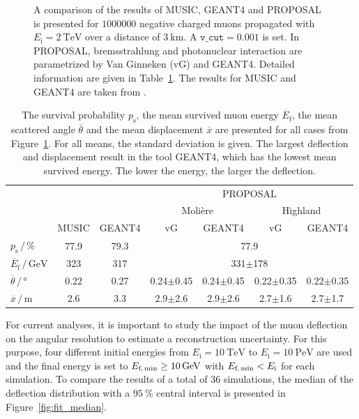 \begin{figure}
    \caption{A comparison of the results of MUSIC, GEANT4 and PROPOSAL is presented for $\num{1000000}$ negative charged muons propagated with 
    $E_{\text{i}} = \SI{2}{\tera\electronvolt}$ over a distance of 
    $\SI{3}{\kilo\meter}$. A $\texttt{v\_cut} = 0.001$ is set. In PROPOSAL, 
    bremsstrahlung and photonuclear interaction are parametrized by 
    Van Ginneken (vG) and GEANT4. Detailed information are given in 
    Table~\ref{tab:compare_MUSIC}. The results for MUSIC and GEANT4 are taken from 
    \cite{comparison_MUSIC_GEANT4_2009}.}
    \label{fig:compare_MUSIC}
\end{figure}



\begin{table}
    \small
    \centering
    \caption{The survival probability $p_{\text{s}}$, the mean survived muon 
    energy $\overline{E}_{\text{f}}$, the mean scattered angle $\overline{\theta}$ 
    and the mean displacement $\overline{x}$ are presented for all cases from 
    Figure~\ref{fig:compare_MUSIC}. For all means, the standard deviation is given.
    The largest deflection and displacement result in the tool GEANT4, which has the lowest mean survived energy. The lower the energy, the larger the deflection.}
    \begin{tabular}{l|cc|cccc}
        \toprule
        & & & \multicolumn{4}{c}{PROPOSAL} \\
        &  & & \multicolumn{2}{c}{Molière} & \multicolumn{2}{c}{Highland} \\
        & MUSIC & GEANT4 & vG & GEANT4 & vG & GEANT4 \\
        \midrule
        $p_{\text{s}}\,/\,\si{\percent}$ & 77.9 & 79.3 &  \multicolumn{4}{c}{77.9}\\
        $\overline{E}_{\text{f}}\,/\,\si{\giga\electronvolt}$ & 323 & 317 & \multicolumn{4}{c}{331$\pm$178} \\
        $\overline{\theta}\,/\,\si{\degree}$ & 0.22 & 0.27 & 0.24$\pm$0.45 & 0.24$\pm$0.45 & 0.22$\pm$0.35 & 0.22$\pm$0.35   \\
        $\overline{x}\,/\,\si{\meter}$ & 2.6 & 3.3 & 2.9$\pm$2.6 & 2.9$\pm$2.6 & 2.7$\pm$1.6 & 2.7$\pm$1.7  \\
     \bottomrule
    \end{tabular}
    \label{tab:compare_MUSIC}
\end{table}




For current analyses, it is important to study the impact of the muon 
deflection on the angular resolution to estimate a reconstruction uncertainty.
For this purpose, four different initial energies 
from $E_{\text{i}} = \SI{10}{\tera\electronvolt}$ to 
$E_{\text{i}} = \SI{10}{\peta\electronvolt}$ are used and the final 
energy is set to $E_{\text{f,\,min}} \geq \SI{10}{\giga\electronvolt}$ with 
$E_{\text{f,\,min}} < E_{\text{i}}$ for each simulation. To compare the results of 
a total of $\num{36}$ simulations, the median of the deflection distribution 
with a $\SI{95}{\percent}$ central interval is presented in 
Figure~\ref{fig:fit_median}.

